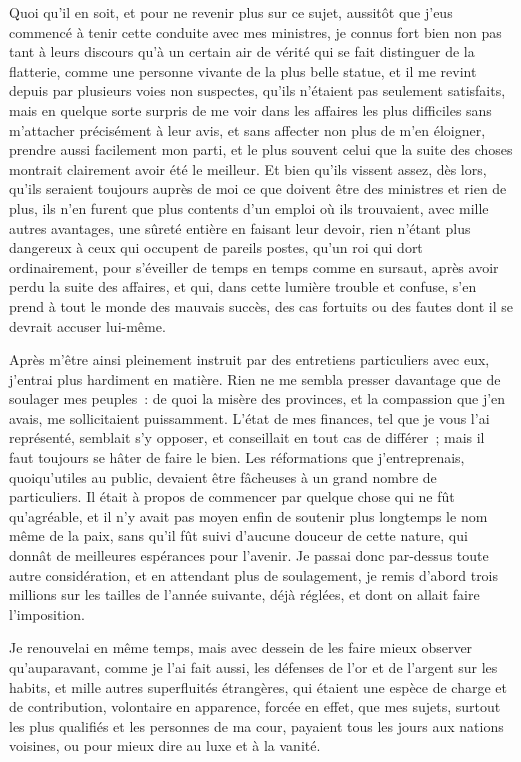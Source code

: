 \documentclass[french,twoside]{book} %
\begin{document}
Quoi qu’il en soit, et pour ne revenir plus sur ce sujet, aussitôt que j’eus commencé à tenir cette conduite avec mes ministres, je connus fort bien non pas tant à leurs discours qu’à un certain air de vérité qui se fait distinguer de la flatterie, comme une personne vivante de la plus belle statue, et il me revint depuis par plusieurs voies non suspectes, qu’ils n’étaient pas seulement satisfaits, mais en quelque sorte surpris de me voir dans les affaires les plus difficiles sans m’attacher précisément à leur avis, et sans affecter non plus de m’en éloigner, prendre aussi facilement mon parti, et le plus souvent celui que la suite des choses montrait clairement avoir été le meilleur. Et bien qu’ils vissent assez, dès lors, qu’ils seraient toujours auprès de moi ce que doivent être des ministres et rien de plus, ils n’en furent que plus contents d’un emploi où ils trouvaient, avec mille autres avantages, une sûreté entière en faisant leur devoir, rien n’étant plus dangereux à ceux qui occupent de pareils postes, qu’un roi qui dort ordinairement, pour s’éveiller de temps en temps comme en sursaut, après avoir perdu la suite des affaires, et qui, dans cette lumière trouble et confuse, s’en prend à tout le monde des mauvais succès, des cas fortuits ou des fautes dont il se devrait accuser lui-même.\par
Après m’être ainsi pleinement instruit par des entretiens particuliers avec eux, j’entrai plus hardiment en matière. Rien ne me sembla presser davantage que de soulager mes peuples : de quoi la misère des provinces, et la compassion que j’en avais, me sollicitaient puissamment. L’état de mes finances, tel que je vous l’ai représenté, semblait s’y opposer, et conseillait en tout cas de différer ; mais il faut toujours se hâter de faire le bien. Les réformations que j’entreprenais, quoiqu’utiles au public, devaient être fâcheuses à un grand nombre de particuliers. Il était à propos de commencer par quelque chose qui ne fût qu’agréable, et il n’y avait pas moyen enfin de soutenir plus longtemps le nom même de la paix, sans qu’il fût suivi d’aucune douceur de cette nature, qui donnât de meilleures espérances pour l’avenir. Je passai donc par-dessus toute autre considération, et en attendant plus de soulagement, je remis d’abord trois millions sur les tailles de l’année suivante, déjà réglées, et dont on allait faire l’imposition.\par
Je renouvelai en même temps, mais avec dessein de les faire mieux observer qu’auparavant, comme je l’ai fait aussi, les défenses de l’or et de l’argent sur les habits, et mille autres superfluités étrangères, qui étaient une espèce de charge et de contribution, volontaire en apparence, forcée en effet, que mes sujets, surtout les plus qualifiés et les personnes de ma cour, payaient tous les jours aux nations voisines, ou pour mieux dire au luxe et à la vanité.\par
\end{document}
